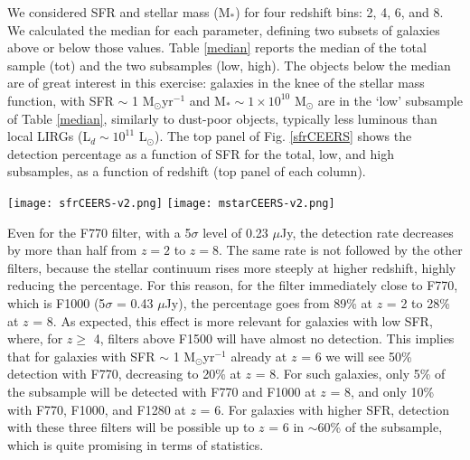 \documentclass{aa}
\begin{document}
We considered SFR and stellar mass (M$_\ast$) for four redshift bins: 2, 4, 6, and 8. We calculated the median for each parameter, defining two subsets of galaxies above or below those values. Table \ref{median} reports the median of the total sample (tot) and the two subsamples (low, high). The objects below the median are of great interest in this exercise: galaxies in the knee of the stellar mass function, with SFR $\sim$ 1 M$_\odot$yr$^{-1}$ and M$_\ast \sim 1\times10^{10}$ M$_\odot$ are in the `low' subsample of Table \ref{median}, similarly to dust-poor objects, typically less luminous than local LIRGs (L$_d \sim 10^{11}$ L$_\odot$). The top panel of Fig. \ref{sfrCEERS} shows the detection percentage as a function of SFR for the total, low, and high subsamples, as a function of redshift (top panel of each column).

\begin{figure*}    \centering
    \texttt{[image: sfrCEERS-v2.png]}
    \texttt{[image: mstarCEERS-v2.png]}
    \caption{Top panels: Best-fit SEDs of CIGALE at different redshifts, marked on top of each column. Coloured horizontal bars indicate the MIRI filters planned for the CEERS survey. Boxes on the left of each panel show the percentage of detection at a given filter. Galaxies are classified according to the SFR with the starting sample on the top row, the `low' subsample in the middle, and the `high' subsample on the bottom row. Median values of each sample are reported in the bottom right of the first panel in each row and Table \ref{median}.
    Bottom panel: Same analysis selecting galaxies according to their stellar masses, as reported in Table \ref{median}.}\label{sfrCEERS}
\end{figure*}

Even for the F770 filter, with a 5$\sigma$ level of 0.23 $\mu$Jy, the detection rate decreases by more than half from $z = 2$ to $z = 8$. The same rate is not followed by the other filters, because the stellar continuum rises more steeply at higher redshift, highly reducing the percentage. For this reason, for the filter immediately close to F770, which is F1000 (5$\sigma$ = 0.43 $\mu$Jy), the percentage goes from 89\% at $z$ = 2 to 28\% at $z$ = 8. As expected, this effect is more relevant for galaxies with low SFR, where, for $z \ge$ 4, filters above F1500 will have almost no detection. This implies that for galaxies with SFR $\sim$ 1 M$_\odot$yr$^{-1}$ already at $z$ = 6 we will see 50\% detection with F770, decreasing to 20\% at $z$ = 8. For such galaxies, only 5\% of the subsample will be detected with F770 and F1000 at $z$ = 8, and only 10\%  with F770, F1000, and F1280 at $z$ = 6. For galaxies with higher SFR, detection with these three filters will be possible up to $z$ = 6 in $\sim$60\% of the subsample, which is quite promising in terms of statistics.
\end{document}
